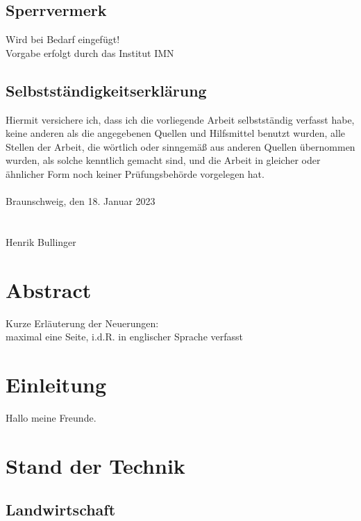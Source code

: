 \documentclass[12pt,
titlepage,
a4paper,
oneside,     %
openany,     %
listof=totoc,  %
numbers = noenddot, %
bibliography=totoc,    %
headsepline, %
]{scrbook} %
\title{\varTitel}
\date{\today}
\author{\varAuthor}
\begin{document}
\frontmatter
{}



\section*{Sperrvermerk}
Wird bei Bedarf eingefügt! \\
Vorgabe erfolgt durch das Institut IMN

\newpage
\section*{Selbstständigkeitserklärung}
Hiermit versichere ich, dass ich die vorliegende Arbeit selbstständig verfasst habe, keine anderen als die angegebenen Quellen und Hilfsmittel benutzt wurden, alle Stellen der Arbeit, die wörtlich oder sinngemäß aus anderen Quellen übernommen wurden, als solche kenntlich gemacht sind, und die Arbeit in gleicher oder ähnlicher Form noch keiner Prüfungsbehörde vorgelegen hat. \\
\\
Braunschweig, den 18. Januar 2023 \\
\\
\\
Henrik Bullinger \\



\listoffigures

\listoftables

\printacronyms

\newpage
\chapter*{Abstract}
Kurze Erläuterung der Neuerungen:\\
maximal eine Seite, i.d.R. in englischer Sprache verfasst

\newpage
\tableofcontents

\mainmatter
\chapter{Einleitung}
\label{cha:einleitung}
Hallo meine Freunde.

\chapter{Stand der Technik}
\label{cha:sdT}

\section{Landwirtschaft}
\label{sec_landwirtschaft}
\end{document}
